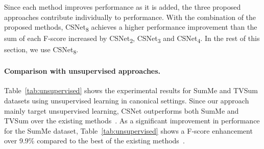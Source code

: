 \documentclass[letterpaper]{article} \usepackage{aaai19}  \usepackage{times}  \usepackage{helvet}  \usepackage{courier}  \usepackage{url}  \usepackage{graphicx}  \frenchspacing  \setlength{\pdfpagewidth}{8.5in}  \setlength{\pdfpageheight}{11in}
\newcommand{\tabref}[1]{Table~\ref{#1}}
\begin{document}
Since each method improves performance as it is added, the three proposed approaches contribute individually to performance. With the combination of the proposed methods, CSNet\textsubscript{8} achieves a higher performance improvement than the sum of each F-score increased by CSNet\textsubscript{2}, CSNet\textsubscript{3} and CSNet\textsubscript{4}. In the rest of this section, we use CSNet\textsubscript{8}.

\begin{table}
\centering
{}
\caption{F-score (\%) of unsupervised methods in canonical setting on SumMe and TVSum datasets. Our approach outperforms other existing methods. Dramatic performance improvement is shown on the SumMe dataset.}
\label{tab:unsupervised}
\end{table}



\paragraph{Comparison with unsupervised approaches.}
\tabref{tab:unsupervised} shows the experimental results for SumMe and TVSum datasets using unsupervised learning in canonical settings. Since our approach mainly target unsupervised learning, CSNet outperforms both SumMe and TVSum over the existing methods~\cite{elhamifar2012see,khosla2013large,de2011vsumm,zhao2014quasi,song2015tvsum,zhou2017deep,Mahasseni2017VAEGAN}. As a significant improvement in performance for the SumMe dataset, \tabref{tab:unsupervised} shows a F-score enhancement over 9.9\% compared to the best of the existing methods~\cite{zhou2017deep}. 
\end{document}

